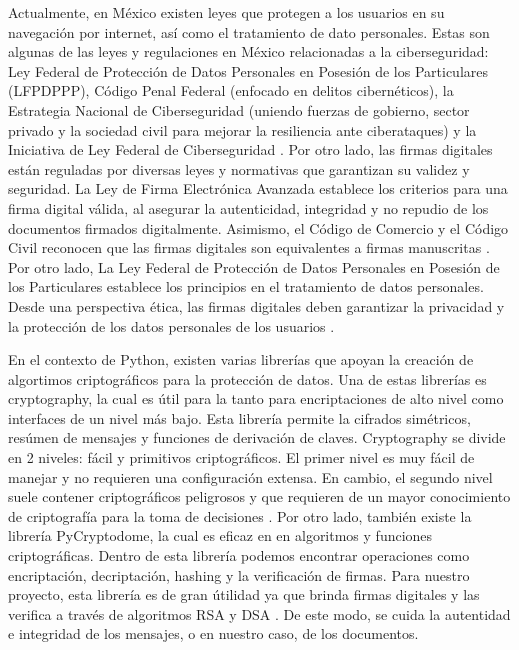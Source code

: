 \documentclass{amsart}
\begin{document}
        
    Actualmente, en México existen leyes que protegen a los usuarios en su navegación por internet, así como el tratamiento de dato personales. Estas son algunas de las leyes y regulaciones en México relacionadas a la ciberseguridad: Ley Federal de Protección de Datos Personales en Posesión de los Particulares (LFPDPPP), Código Penal Federal (enfocado en delitos cibernéticos), la Estrategia Nacional de Ciberseguridad (uniendo fuerzas de gobierno, sector privado y la sociedad civil para mejorar la resiliencia ante ciberataques) y la Iniciativa de Ley Federal de Ciberseguridad \parencite{LeyCiber}. Por otro lado, las firmas digitales están reguladas por diversas leyes y normativas que garantizan su validez y seguridad. La Ley de Firma Electrónica Avanzada establece los criterios para una firma digital válida, al asegurar la autenticidad, integridad y no repudio de los documentos firmados digitalmente. Asimismo, el Código de Comercio y el Código Civil reconocen que las firmas digitales son equivalentes a firmas manuscritas \parencite{Contratos}. Por otro lado, La Ley Federal de Protección de Datos Personales en Posesión de los Particulares establece los principios  en el tratamiento de datos personales. Desde una perspectiva ética, las firmas digitales deben garantizar la privacidad y la protección de los datos personales de los usuarios \parencite{Hacienda}. 

    En el contexto de Python, existen varias librerías que apoyan la creación de algortimos criptográficos para la protección de datos. Una de estas librerías es cryptography, la cual es útil para la tanto para encriptaciones de alto nivel como interfaces de un nivel más bajo. Esta librería permite la cifrados simétricos, resúmen de mensajes y funciones de derivación de claves. Cryptography se divide en 2 niveles: fácil y primitivos criptográficos. El primer nivel es muy fácil de manejar y no requieren una configuración extensa. En cambio, el segundo nivel suele contener criptográficos peligrosos y que requieren de un mayor conocimiento de criptografía para la toma de decisiones \parencite{Cryptography}.
	Por otro lado, también existe la librería PyCryptodome, la cual es eficaz en en algoritmos y funciones criptográficas. Dentro de esta librería podemos encontrar operaciones como encriptación, decriptación, hashing y la verificación de firmas. Para nuestro proyecto, esta librería es de gran útilidad ya que brinda firmas digitales y las verifica a través de algoritmos RSA y DSA \parencite{Geeks}. De este modo, se cuida la autentidad e integridad de los mensajes, o en nuestro caso, de los documentos. 
	
\end{document}
